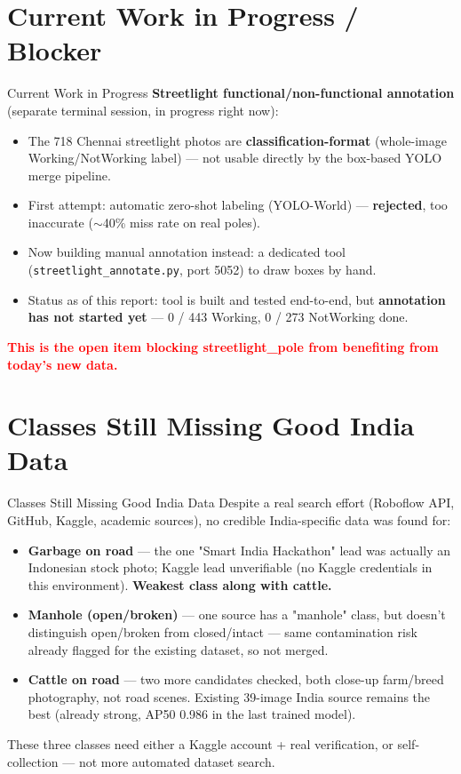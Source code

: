 \documentclass[10pt]{beamer}
\begin{document}
\section{Current Work in Progress / Blocker}
\begin{frame}{Current Work in Progress}
  \textbf{Streetlight functional/non-functional annotation} (separate terminal session,
  in progress right now):
  \begin{itemize}
    \item The 718 Chennai streetlight photos are \textbf{classification-format} (whole-image
      Working/NotWorking label) — not usable directly by the box-based YOLO merge pipeline.
    \item First attempt: automatic zero-shot labeling (YOLO-World) — \textbf{rejected}, too
      inaccurate ($\sim$40\% miss rate on real poles).
    \item Now building manual annotation instead: a dedicated tool
      (\texttt{streetlight\_annotate.py}, port 5052) to draw boxes by hand.
    \item Status as of this report: tool is built and tested end-to-end, but
      \textbf{annotation has not started yet} — 0 / 443 Working, 0 / 273 NotWorking done.
  \end{itemize}
  \textcolor{red}{\textbf{This is the open item blocking streetlight\_pole from benefiting
  from today's new data.}}
\end{frame}

\section{Classes Still Missing Good India Data}
\begin{frame}{Classes Still Missing Good India Data}
  Despite a real search effort (Roboflow API, GitHub, Kaggle, academic sources), no
  credible India-specific data was found for:
  \begin{itemize}
    \item \textbf{Garbage on road} — the one "Smart India Hackathon" lead was actually an
      Indonesian stock photo; Kaggle lead unverifiable (no Kaggle credentials in this
      environment). \textbf{Weakest class along with cattle.}
    \item \textbf{Manhole (open/broken)} — one source has a "manhole" class, but doesn't
      distinguish open/broken from closed/intact — same contamination risk already
      flagged for the existing dataset, so not merged.
    \item \textbf{Cattle on road} — two more candidates checked, both close-up farm/breed
      photography, not road scenes. Existing 39-image India source remains the best
      (already strong, AP50 0.986 in the last trained model).
  \end{itemize}
  \vspace{0.3em}
  \small These three classes need either a Kaggle account + real verification, or
  self-collection — not more automated dataset search.
\end{frame}
\end{document}
